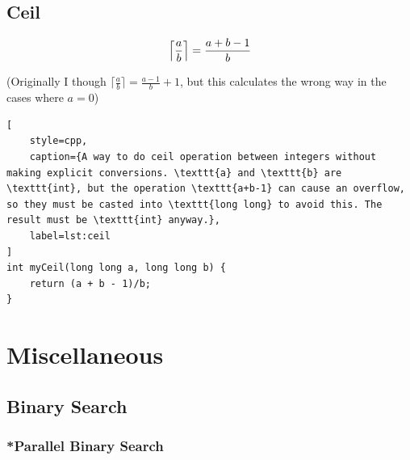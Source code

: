 \documentclass[letterpaper,landscape]{article}
\begin{document}
\subsection{Ceil}

\[ \Bigl\lceil \frac{a}{b} \Bigr\rceil = \frac{a + b - 1}{b}\]

(Originally I though $\lceil \frac{a}{b} \rceil = \frac{a - 1}{b}+1$, but this calculates the wrong way in the cases where $a = 0$)

\begin{lstlisting}[
    style=cpp,
    caption={A way to do ceil operation between integers without making explicit conversions. \texttt{a} and \texttt{b} are \texttt{int}, but the operation \texttt{a+b-1} can cause an overflow, so they must be casted into \texttt{long long} to avoid this. The result must be \texttt{int} anyway.},
    label=lst:ceil
]
int myCeil(long long a, long long b) {
    return (a + b - 1)/b;
}
\end{lstlisting}

\section{Miscellaneous}

\subsection{Binary Search}







\subsubsection{*Parallel Binary Search}
\end{document}

